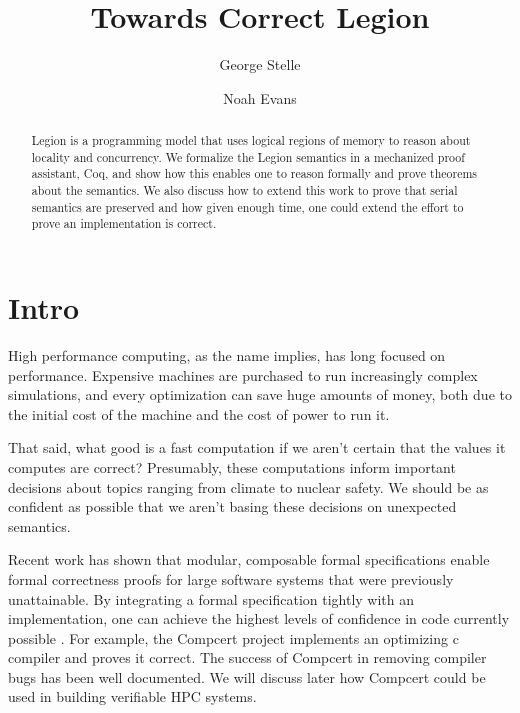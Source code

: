 \documentclass[sigplan]{acmart}
\begin{document}
\title{Towards Correct Legion}
\author{George Stelle}

\author{Noah Evans}

\begin{abstract}
Legion is a programming model that uses logical regions of memory to reason about 
locality and concurrency. We formalize the Legion semantics in a mechanized
proof assistant, Coq, and show how this enables one to reason formally and
prove theorems about the semantics. We also discuss how to extend this work to
prove that serial semantics are preserved and how given enough time, one could
extend the effort to prove an implementation is correct.
\end{abstract}

\maketitle

\section{Intro}
High performance computing, as the name implies, has long focused on
performance. Expensive machines are purchased to run increasingly complex
simulations, and every optimization can save huge amounts of money, both due to
the initial cost of the machine and the cost of power to run it. 

That said, what good is a fast computation if we aren't certain that the
values it computes are correct? Presumably, these computations inform important
decisions about topics ranging from climate to nuclear safety. We should be as
confident as possible that we aren't basing these decisions on unexpected
semantics.

Recent work has shown that modular, composable formal specifications enable
formal correctness proofs for large software systems that were previously
unattainable. By integrating a formal specification tightly with an
implementation, one can achieve the highest levels of confidence in code
currently possible \cite{?}. For example, the Compcert project implements an
optimizing c compiler and proves it correct. The success of Compcert in
removing compiler bugs has been well documented. We will discuss later how 
Compcert could be used in building verifiable HPC systems.
\end{document}
